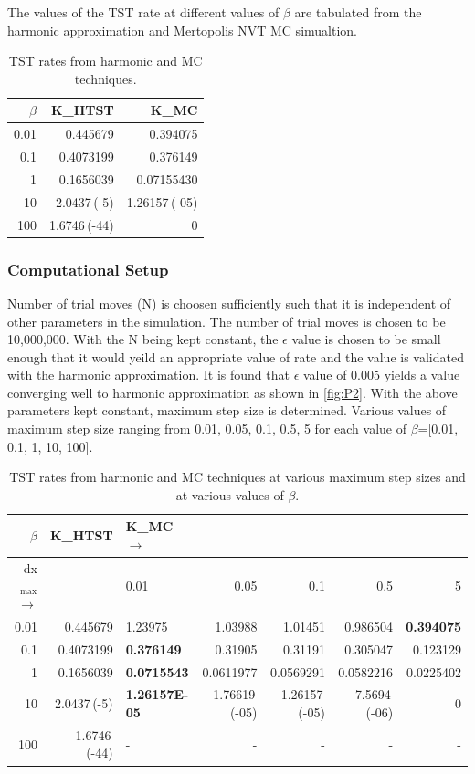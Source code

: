 \documentclass{article}
\begin{document}
The values of the TST rate at different values of $\beta$ are tabulated from the harmonic approximation and Mertopolis NVT MC simualtion.
\begin{table}[htb]
\caption{TST rates from harmonic and MC techniques.}
\centering
\begin{tabular}{rrr}
$\beta$ & K\_HTST & K\_MC\\
\hline
0.01 & 0.445679 & 0.394075\\
0.1 & 0.4073199 & 0.376149\\
1 & 0.1656039 & 0.07155430\\
10 & 2.0437\,(-5) & 1.26157\,(-05)\\
100 & 1.6746\,(-44) & 0\\
\end{tabular}
\end{table}

\subsubsection{Computational Setup}
\label{sec-2-1-1}
Number of trial moves (N) is choosen sufficiently such that it is independent of other parameters in the simulation. The number of trial moves is chosen to be 10,000,000. With the N being kept constant, the $\epsilon$ value is chosen to be small enough that it would yeild an appropriate value of rate and the value is validated with the harmonic approximation. It is found that $\epsilon$ value of 0.005 yields a value converging well to harmonic approximation as shown in \ref{fig:P2}. With the above parameters kept constant, maximum step size is determined. Various values of maximum step size ranging from 0.01, 0.05, 0.1, 0.5, 5 for each value of $\beta$=[0.01, 0.1, 1, 10, 100].

\begin{table}[htb]
\caption{TST rates from harmonic and MC techniques at various maximum step sizes and at various values of $\beta$.}
\centering
\begin{tabular}{rrlrrrr}
$\beta$ & K\_HTST & K\_MC $\rightarrow$ &  &  &  & \\
\hline
dx$_{\text{max}}$ $\rightarrow$ &  & 0.01 & 0.05 & 0.1 & 0.5 & 5\\
0.01 & 0.445679 & 1.23975 & 1.03988 & 1.01451 & 0.986504 & \textbf{0.394075}\\
0.1 & 0.4073199 & \textbf{0.376149} & 0.31905 & 0.31191 & 0.305047 & 0.123129\\
1 & 0.1656039 & \textbf{0.0715543} & 0.0611977 & 0.0569291 & 0.0582216 & 0.0225402\\
10 & 2.0437\,(-5) & \textbf{1.26157E-05} & 1.76619\,(-05) & 1.26157\,(-05) & 7.5694\,(-06) & 0\\
100 & 1.6746\,(-44) & - & - & - & - & -\\
\end{tabular}
\end{table}
\end{document}
